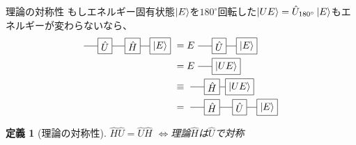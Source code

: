 \documentclass[dvipdfm]{beamer}
\newtheorem*{defn}{定義}
\begin{document}
\begin{frame}{理論の対称性}
    もしエネルギー固有状態$\ket{E}$を$180^\circ$回転した$\ket{UE}=\hat{U}_{180^\circ}\ket{E}$もエネルギーが変わらないなら、
    \begin{equation*}
        \begin{split}
            \vcenter{\hbox{
                \begin{tikzpicture}
                    \node at(0,0)[draw,rectangle](U){$\hat{U}$};
                    \node at(1,0)[draw,rectangle](H){$\hat{H}$};
                    \node at(2,0)[draw,rectangle](E){$\ket{E}$};
                    \draw(U.west)--++(-.5,0)(U.east)--(H.west)(H.east)--(E.west);
                \end{tikzpicture}
            }}
            &=
            E
            \vcenter{\hbox{
                \begin{tikzpicture}
                    \node at(0,0)[draw,rectangle](U){$\hat{U}$};
                    \node at(1,0)[draw,rectangle](E){$\ket{E}$};
                    \draw(U.west)--++(-.5,0)(U.east)--(E.west);
                \end{tikzpicture}
            }}
            \\
            &=
            E
            \vcenter{\hbox{
                \begin{tikzpicture}
                    \node at(0,0)[draw,rectangle](U){$\ket{UE}$};
                    \draw(U.west)--++(-.5,0);
                \end{tikzpicture}
            }}
            \\
            &\equiv
            \vcenter{\hbox{
                \begin{tikzpicture}
                    \node at(0,0)[draw,rectangle](U){$\ket{UE}$};
                    \node at(-1,0)[draw,rectangle](H){$\hat{H}$};
                    \draw(H.west)--++(-.5,0)(H.east)--(U.west);
                \end{tikzpicture}
            }}
            \\
            &=
            \vcenter{\hbox{
                \begin{tikzpicture}
                    \node at(0,0)[draw,rectangle](U){$\hat{H}$};
                    \node at(1,0)[draw,rectangle](H){$\hat{U}$};
                    \node at(2,0)[draw,rectangle](E){$\ket{E}$};
                    \draw(U.west)--++(-.5,0)(U.east)--(H.west)(H.east)--(E.west);
                \end{tikzpicture}
            }}
        \end{split}
    \end{equation*}
    \begin{defn}[理論の対称性]
        $\hat{H}\hat{U}=\hat{U}\hat{H}$
        $\Longleftrightarrow$理論$\hat{H}$は$\hat{U}$で対称
    \end{defn}
\end{frame}
\end{document}
